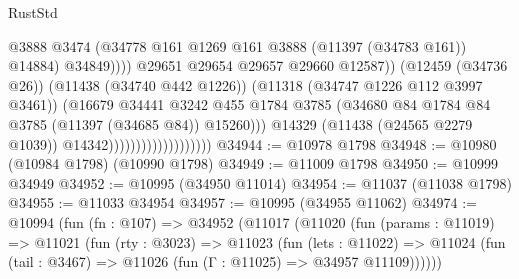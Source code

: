 \begin{lexlean}{RustStd}
\begin{coremodule}
                                                        @3888
                                                        @3474
                                                        (@34778
                                                          @161
                                                          @1269
                                                          @161
                                                          @3888
                                                          (@11397 (@34783 @161))
                                                          @14884)
                                                        @34849))))
                                                @29651
                                                @29654
                                                @29657
                                                @29660
                                                @12587))
                                            (@12459 (@34736 @26))
                                            (@11438 (@34740 @442 @1226))
                                            (@11318 (@34747 @1226 @112 @3997 @3461))
                                            (@16679
                                              @34441
                                              @3242
                                              @455
                                              @1784
                                              @3785
                                              (@34680
                                                @84
                                                @1784
                                                @84
                                                @3785
                                                (@11397 (@34685 @84))
                                                @15260)))
                                          @14329
                                          (@11438 (@24565 @2279 @1039))
                                          @14342)))))))))))))))))))
@34944 := @10978 @1798
@34948 := @10980 (@10984 @1798) (@10990 @1798)
@34949 := @11009 @1798
@34950 := @10999 @34949
@34952 := @10995 (@34950 @11014)
@34954 := @11037 (@11038 @1798)
@34955 := @11033 @34954
@34957 := @10995 (@34955 @11062)
@34974 := @10994
    (fun (fn : @107) =>
    @34952
      (@11017
        (@11020
          (fun (params : @11019) =>
          @11021
            (fun (rty : @3023) =>
            @11023
              (fun (lets : @11022) =>
              @11024 (fun (tail : @3467) => @11026 (fun (Γ : @11025) => @34957 @11109))))))

\end{coremodule}
\end{lexlean}
